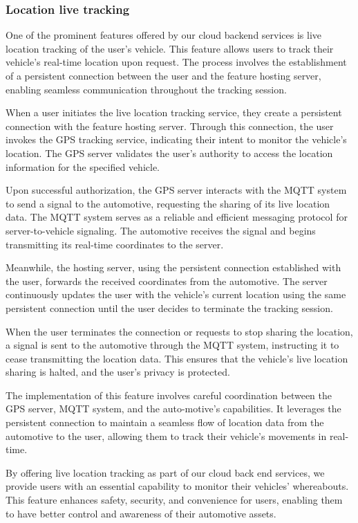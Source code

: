 \documentclass[
12pt,
oneside, 
onehalfspacing, 
nolistspacing, 
parskip, 
chapterinoneline, 
]{AASTCOMPUTER}
\begin{document}
\subsubsection{Location live tracking}
One of the prominent features offered by our cloud backend services is live location tracking of the user's vehicle. This feature allows users to track their vehicle's real-time location upon request. The process involves the establishment of a persistent connection between the user and the feature hosting server, enabling seamless communication throughout the tracking session.

When a user initiates the live location tracking service, they create a persistent connection with the feature hosting server. Through this connection, the user invokes the GPS tracking service, indicating their intent to monitor the vehicle's location. The GPS server validates the user's authority to access the location information for the specified vehicle.

Upon successful authorization, the GPS server interacts with the MQTT system to send a signal to the automotive, requesting the sharing of its live location data. The MQTT system serves as a reliable and efficient messaging protocol for server-to-vehicle signaling. The automotive receives the signal and begins transmitting its real-time coordinates to the server.

Meanwhile, the hosting server, using the persistent connection established with the user, forwards the received coordinates from the automotive. The server continuously updates the user with the vehicle's current location using the same persistent connection until the user decides to terminate the tracking session.

When the user terminates the connection or requests to stop sharing the location, a signal is sent to the automotive through the MQTT system, instructing it to cease transmitting the location data. This ensures that the vehicle's live location sharing is halted, and the user's privacy is protected.

The implementation of this feature involves careful coordination between the GPS server, MQTT system, and the auto-motive's capabilities. It leverages the persistent connection to maintain a seamless flow of location data from the automotive to the user, allowing them to track their vehicle's movements in real-time.

By offering live location tracking as part of our cloud back end services, we provide users with an essential capability to monitor their vehicles' whereabouts. This feature enhances safety, security, and convenience for users, enabling them to have better control and awareness of their automotive assets.
\end{document}
